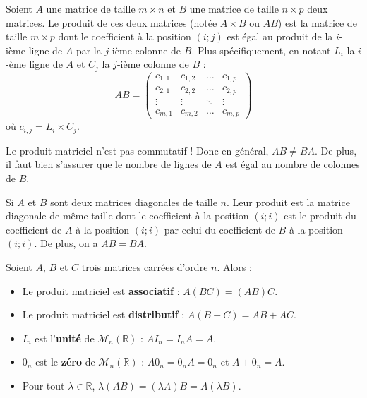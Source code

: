 	\begin{formula}
		Soient $A$ une matrice de taille $m \times n$ et $B$ une matrice de taille $n \times p$ deux matrices. Le produit de ces deux matrices (notée $A \times B$ ou $AB$) est la matrice de taille $m \times p$ dont le coefficient à la position $(i; j)$ est égal au produit de la $i$-ième ligne de $A$ par la $j$-ième colonne de $B$. Plus spécifiquement, en notant $L_i$ la $i$-ème ligne de $A$ et $C_j$ la $j$-ième colonne de $B$ :
		\[ AB = \begin{pmatrix}c_{1,1} & c_{1,2} & \dots & c_{1,p} \\ c_{2,1} & c_{2,2} & \dots & c_{2,p} \\ \vdots & \vdots & \ddots & \vdots \\ c_{m,1} & c_{m,2} & \dots & c_{m,p}\end{pmatrix} \]
		où $c_{i,j} = L_i \times C_j$.
	\end{formula}

	\begin{tip}[Attention !]
		Le produit matriciel n'est pas commutatif ! Donc en général, $AB \neq BA$.
		\newpar
		De plus, il faut bien s'assurer que le nombre de lignes de $A$ est égal au nombre de colonnes de $B$.
	\end{tip}

	\begin{tip}
		Si $A$ et $B$ sont deux matrices diagonales de taille $n$. Leur produit est la matrice diagonale de même taille dont le coefficient à la position $(i; i)$ est le produit du coefficient de $A$ à la position $(i;i)$ par celui du coefficient de $B$ à la position $(i;i)$. De plus, on a $AB = BA$.
	\end{tip}

	\begin{formula}
		Soient $A$, $B$ et $C$ trois matrices carrées d'ordre $n$. Alors :
		\begin{itemize}
			\item Le produit matriciel est \textbf{associatif} : $A(BC) = (AB)C$.
			\item Le produit matriciel est \textbf{distributif} : $A(B + C) = AB + AC$.
			\item $I_n$ est l'\textbf{unité} de $\mathcal{M}_{n}(\mathbb{R})$ : $AI_n = I_nA = A$.
			\item $0_n$ est le \textbf{zéro} de $\mathcal{M}_{n}(\mathbb{R})$ : $A0_n = 0_nA = 0_n$ et $A + 0_n = A$.
			\item Pour tout $\lambda \in \mathbb{R}$, $\lambda (AB) = (\lambda A)B = A(\lambda B)$.
		\end{itemize}
	\end{formula}

